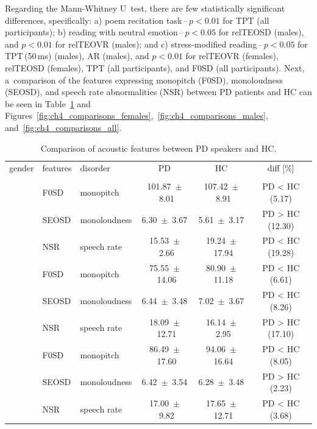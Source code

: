 Regarding the Mann-Whitney U~test, there are few statistically significant differences, specifically: a) poem recitation task\,--\,$p<0.01$ for TPT (all participants); b) reading with neutral emotion\,--\,$p<0.05$ for relTEOSD (males), and $p<0.01$ for relTEOVR (males); and c) stress-modified reading\,--\,$p<0.05$ for TPT\,(50\,ms) (males), AR (males), and $p<0.01$ for relTEOVR (females), relTEOSD (females), TPT (all participants), and F0SD (all participants). Next, a~comparison of the features expressing monopitch (F0SD), monoloudness (SEOSD), and speech rate abnormalities (NSR) between PD patients and HC can be seen in Table~\ref{tab:ch4_comparisons} and Figures~\ref{fig:ch4_comparisons_females},~\ref{fig:ch4_comparisons_males}, and~\ref{fig:ch4_comparisons_all}.

\begin{table}[!htb]
	\centering
	\begin{threeparttable}
		\caption{Comparison of acoustic features between PD speakers and HC.}
		\label{tab:ch4_comparisons}
		\footnotesize
		\centering
		\begin{tabular}{l l l c c c} 

			\hline\hline\noalign{\smallskip}
			\rowcolor{gray_table}
			gender & features & disorder & PD & HC & diff [\%] \\
			\noalign{\smallskip}
			\multicolumn{6}{c}{Poem recitation} \\
			\noalign{\smallskip}\hline\noalign{\smallskip}
			
			\multirow{3}{*}{females} &
			  F0SD  & monopitch    & 101.87~$\pm$~8.01 & 107.42~$\pm$~8.91 & PD < HC (5.17) \\
			& SEOSD & monoloudness &   6.30~$\pm$~3.67 &   5.61~$\pm$~3.17 & PD > HC (12.30) \\
			& NSR 	& speech rate  &  15.53~$\pm$~2.66 &  19.24~$\pm$~17.94 & PD < HC (19.28) \\
			\noalign{\smallskip}
			
			\multirow{3}{*}{males} &
			  F0SD  & monopitch    &  75.55~$\pm$~14.06 &  80.90~$\pm$~11.18 & PD < HC (6.61) \\
			& SEOSD & monoloudness &   6.44~$\pm$~3.48  &   7.02~$\pm$~3.67 & PD < HC (8.26) \\
			& NSR 	& speech rate  &  18.09~$\pm$~12.71 &  16.14~$\pm$~2.95 & PD > HC (17.10) \\
			\noalign{\smallskip}
			
			\multirow{3}{*}{all} &
			  F0SD  & monopitch    &  86.49~$\pm$~17.60 &  94.06~$\pm$~16.64 & PD < HC (8.05) \\
			& SEOSD & monoloudness &   6.42~$\pm$~3.54  &   6.28~$\pm$~3.48 & PD > HC (2.23) \\
			& NSR 	& speech rate  &  17.00~$\pm$~9.82  &  17.65~$\pm$~12.71 & PD < HC (3.68) \\
			

\end{tabular}
\end{threeparttable}
\end{table}
